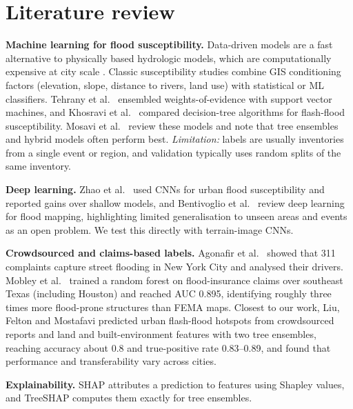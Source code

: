 \documentclass{article}
\begin{document}
\section{Literature review}
\textbf{Machine learning for flood susceptibility.} Data-driven models are a fast alternative to physically based hydrologic models, which are computationally expensive at city scale \cite{mosavi2018review}. Classic susceptibility studies combine GIS conditioning factors (elevation, slope, distance to rivers, land use) with statistical or ML classifiers. Tehrany et al.\ \cite{tehrany2014svm} ensembled weights-of-evidence with support vector machines, and Khosravi et al.\ \cite{khosravi2018trees} compared decision-tree algorithms for flash-flood susceptibility. Mosavi et al.\ \cite{mosavi2018review} review these models and note that tree ensembles and hybrid models often perform best. \emph{Limitation:} labels are usually inventories from a single event or region, and validation typically uses random splits of the same inventory.

\textbf{Deep learning.} Zhao et al.\ \cite{zhao2020cnn} used CNNs for urban flood susceptibility and reported gains over shallow models, and Bentivoglio et al.\ \cite{bentivoglio2022review} review deep learning for flood mapping, highlighting limited generalisation to unseen areas and events as an open problem. We test this directly with terrain-image CNNs.

\textbf{Crowdsourced and claims-based labels.} Agonafir et al.\ \cite{agonafir2022nyc311} showed that 311 complaints capture street flooding in New York City and analysed their drivers. Mobley et al.\ \cite{mobley2021texas} trained a random forest on flood-insurance claims over southeast Texas (including Houston) and reached AUC 0.895, identifying roughly three times more flood-prone structures than FEMA maps. Closest to our work, Liu, Felton and Mostafavi \cite{liu2024interpretable} predicted urban flash-flood hotspots from crowdsourced reports and land and built-environment features with two tree ensembles, reaching accuracy about 0.8 and true-positive rate 0.83--0.89, and found that performance and transferability vary across cities.

\textbf{Explainability.} SHAP \cite{lundberg2017shap} attributes a prediction to features using Shapley values, and TreeSHAP \cite{lundberg2020trees} computes them exactly for tree ensembles.
\end{document}
